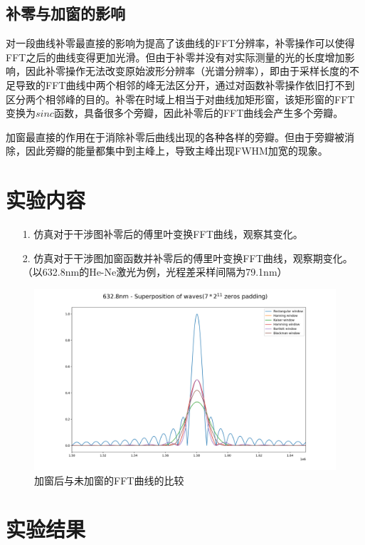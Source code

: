 \documentclass[conference]{IEEEtran}
\begin{document}
\subsection{补零与加窗的影响}
对一段曲线补零最直接的影响为提高了该曲线的FFT分辨率，补零操作可以使得FFT之后的曲线变得更加光滑。但由于补零并没有对实际测量的光的长度增加影响，因此补零操作无法改变原始波形分辨率（光谱分辨率），即由于采样长度的不足导致的FFT曲线中两个相邻的峰无法区分开，通过对函数补零操作依旧打不到区分两个相邻峰的目的。补零在时域上相当于对曲线加矩形窗，该矩形窗的FFT变换为$sinc$函数，具备很多个旁瓣，因此补零后的FFT曲线会产生多个旁瓣。

加窗最直接的作用在于消除补零后曲线出现的各种各样的旁瓣。但由于旁瓣被消除，因此旁瓣的能量都集中到主峰上，导致主峰出现FWHM加宽的现象。


\section{实验内容}
\begin{itemize}
    \item[1.] 仿真对于干涉图补零后的傅里叶变换FFT曲线，观察其变化。
    \item[2.] 仿真对于干涉图加窗函数并补零后的傅里叶变换FFT曲线，观察期变化。（以632.8nm的He-Ne激光为例，光程差采样间隔为79.1nm）
\end{itemize}

\begin{figure}[htbp]
	\centerline{
		\includegraphics[width=22cm]{pic7.png} 	
	}
	\caption{加窗后与未加窗的FFT曲线的比较}
	\label{pic7}
\end{figure}

\section{实验结果}
\end{document}
